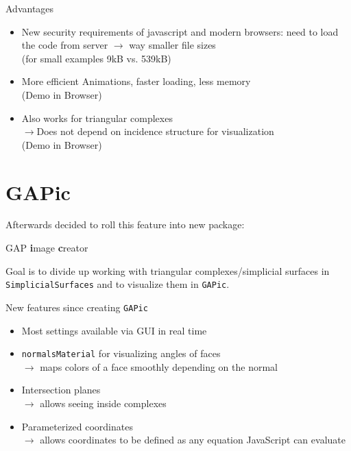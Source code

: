 \documentclass{beamer}
\numberwithin{equation}{aufgabe}
\begin{document}
\begin{frame}
    \begin{exampleblock}{Advantages}
        \begin{itemize}[label=-]
            \item New security requirements of javascript and modern browsers: need to load the code from server $\xrightarrow{}$ way smaller file sizes\\
                (for small examples 9kB vs. 539kB)
                \pause
            \item More efficient Animations, faster loading, less memory\\
                (Demo in Browser)
                \pause
            \item Also works for triangular complexes\\
            $\xrightarrow{}$Does not depend on incidence structure for visualization\\
            (Demo in Browser)
        \end{itemize}
    \end{exampleblock}
\end{frame}

\section{GAPic}
\begin{frame}
    Afterwards decided to roll this feature into new package: \\
    \begin{center}
        GAP \textbf{i}mage \textbf{c}reator    
    \end{center}
    \pause
    Goal is to divide up working with triangular complexes/simplicial surfaces in \texttt{SimplicialSurfaces} and to visualize them in \texttt{GAPic}.
\end{frame}

\begin{frame}
    \begin{exampleblock}{New features since creating \texttt{GAPic}}
        \begin{itemize}[label=-]
            \item Most settings available via GUI in real time \pause
            \item \texttt{normalsMaterial} for visualizing angles of faces\\
            $\xrightarrow{}$ maps colors of a face smoothly depending on the normal \pause
            \item Intersection planes\\
            $\xrightarrow{}$ allows seeing inside complexes \pause
            \item Parameterized coordinates \\
            $\xrightarrow{}$ allows coordinates to be defined as any equation JavaScript can evaluate
        \end{itemize}
    \end{exampleblock}
\end{frame}
\end{document}
